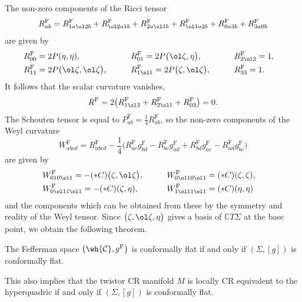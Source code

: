 The non-zero components of the Ricci tensor
\[
R^{\mathrm{F}}_{ab}=R^{\mathrm{F}}_{1a\ol2b}+R^{\mathrm{F}}_{\ol2a1b}+R^{\mathrm{F}}_{2a\ol1b}+R^{\mathrm{F}}_{\ol1a2b}+R^{\mathrm{F}}_{0a3b}+R^{\mathrm{F}}_{3a0b}
\]
are given by
\begin{alignat*}{4}
&R^{\mathrm{F}}_{00}=2P(\eta, \eta), \qquad&&
R^{\mathrm{F}}_{01}=2P\bigl(\ol\zeta, \eta\bigr), \qquad&&
R^{\mathrm{F}}_{2\ol2}=1,& \\
&R^{\mathrm{F}}_{11}=2P\bigl(\ol\zeta, \ol\zeta\bigr),\qquad&&
R^{\mathrm{F}}_{1\ol1}=2P\bigl(\zeta, \ol\zeta\bigr),\qquad&&
R^{\mathrm{F}}_{33}=1.&
\end{alignat*}
It follows that the scalar curvature vanishes,
\[
R^{\mathrm{F}}=2\bigl(R^{\mathrm{F}}_{1\ol2}+R^{\mathrm{F}}_{2\ol1}+R^{\mathrm{F}}_{03}\bigr)=0.
\]
The Schouten tensor is equal to $P^{\mathrm{F}}_{ab}=\frac{1}{4}R^{\mathrm{F}}_{ab}$, so the non-zero components of the Weyl curvature
\[
W^{\mathrm{F}}_{abcd}=R^{\mathrm{F}}_{abcd}-\frac{1}{4}
\bigl(R^{\mathrm{F}}_{ac}g^{\mathrm{F}}_{bd}-R^{\mathrm{F}}_{bc}g^{\mathrm{F}}_{ad}+R^{\mathrm{F}}_{bd}g^{\mathrm{F}}_{ac}-R^{\mathrm{F}}_{ad}g^{\mathrm{F}}_{bc}\bigr)
\]
are given by
\begin{alignat*}{3}
&W^{\mathrm{F}}_{010\ol1}=-(*C)\bigl(\zeta, \ol\zeta\bigr),\qquad&&
W^{\mathrm{F}}_{0\ol10\ol1}=(*C)(\zeta, \zeta),& \\
&W^{\mathrm{F}}_{0\ol11\ol1}=-(*C)(\zeta, \eta),\qquad&&
W^{\mathrm{F}}_{1\ol11\ol1}=(*C)(\eta, \eta)&
\end{alignat*}
and the components which can be obtained from these by the symmetry and reality of the Weyl tensor.
Since $\bigl(\zeta, \ol\zeta, \eta\bigr)$ gives a basis of $\mathbb{C}T\Sigma$ at the base point, we obtain the following theorem.

\begin{Theorem}\label{flat}
The Fefferman space $\bigl(\wh{\mathcal{C}}, g^{\mathrm{F}}\bigr)$ is conformally flat if and only if $(\Sigma, [g])$ is conformally flat.
\end{Theorem}

This also implies that the twistor CR manifold $M$ is locally CR equivalent to the hyperquadric if and only if $(\Sigma, [g])$ is conformally flat.

